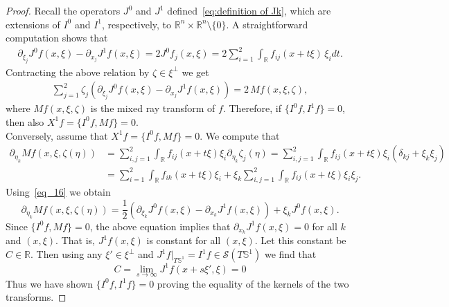 \documentclass[11pt]{article}
\newcommand{\Rc}{\mathcal{R}}
\newcommand{\Rb}{\mathbb{R}}
\newcommand{\p}{\partial}
\newcommand{\sch}{\mathcal{S}}
\newtheorem{definition}[theorem]{Definition}
\newcommand{\lr}[1]{\left(#1\right)}
\begin{document}
\begin{proof}
Recall the operators $J^0$ and $J^1$ defined~\eqref{eq:definition of Jk}, which are extensions of $I^0$ and $I^1$, respectively, to $\Rb^n \times \Rb^n \setminus \{0\}$. A straightforward computation shows that
\begin{align}\label{eq_16}
	\p_{\xi_j} J^0f(x, \xi) - \p_{x_j}J^1f (x, \xi) = 2 J^0f_j(x, \xi) =  2\sum_{i=1}^2\int_{\Rb} f_{ij}(x+t\xi)\, \xi_i d t. 
\end{align}
Contracting the above relation by $\zeta \in \xi^{\perp}$ we get
\begin{align}
 \sum_{j=1}^2\zeta_j\lr{\p_{\xi_j} J^0f(x, \xi)  - \p_{x_j}J^1f(x, \xi)} =  2\, Mf(x, \xi, \zeta), 
\end{align}
where $Mf (x, \xi, \zeta)$ is the mixed ray transform of $f$. Therefore, if $\{I^0f,I^1f\} = 0$, then also $X^1f = \{I^0f,Mf\} = 0$.
\vspace{2mm}\\
Conversely, assume that $X^1f = \{I^0f,Mf\} = 0$. We compute that
\begin{align}
\partial_{\eta_k} Mf (x, \xi, \zeta(\eta))
&= \sum_{i,j=1}^2 \int_{\Rb} f_{ij}(x+t\xi)\xi_i \partial_{\eta_k}\zeta_j(\eta)=  \sum_{i,j=1}^2 \int_\mathbb{R}
f_{ij}(x+t\xi)\xi_i(\delta_{kj} + \xi_k\xi_j)
\\ &=  \sum_{i= 1}^2 \int_{\Rb} f_{ik} (x+t\xi)\xi_i +
\xi_k  \sum_{i,j=1}^2 \int_{\Rb} f_{ij} (x+t\xi)\xi_i \xi_j .
\end{align}
Using~\eqref{eq_16} we obtain
\begin{equation}
\p_{\eta_k}Mf (x, \xi,\zeta(\eta))
=
\frac{1}{2}
\left(
\p_{\xi_k} J^0f (x, \xi)
-
\p_{x_k}J^1f (x, \xi)
\right)
+
\xi_kJ^0f(x,\xi).
\end{equation}
Since $\{I^0f,Mf\} = 0$, the above equation implies that $\partial_{x_k}J^1f(x,\xi) = 0$ for all $k$ and $(x,\xi)$. That is, $J^1f(x,\xi)$ is constant for all $(x,\xi)$. Let this constant be $C \in \mathbb{R}$. Then using any $\xi' \in \xi^\perp$ and $J^1f|_{T\mathbb{S}^1} = I^1f \in \sch(T\mathbb{S}^1)$ we find that
\begin{equation}
C
=
\lim_{s \to \infty}
J^1f(x+s\xi',\xi)
=
0
\end{equation}
Thus we have shown $\{I^0f,I^1f\} = 0$ proving the equality of the kernels of the two transforms.
\end{proof}
\end{document}
